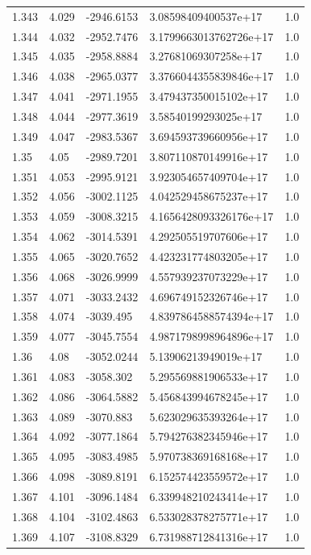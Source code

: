 \begin{tabular}{lllll}
1.343 & 4.029 & -2946.6153 & 3.08598409400537e+17 & 1.0 \\
1.344 & 4.032 & -2952.7476 & 3.1799663013762726e+17 & 1.0 \\
1.345 & 4.035 & -2958.8884 & 3.27681069307258e+17 & 1.0 \\
1.346 & 4.038 & -2965.0377 & 3.3766044355839846e+17 & 1.0 \\
1.347 & 4.041 & -2971.1955 & 3.479437350015102e+17 & 1.0 \\
1.348 & 4.044 & -2977.3619 & 3.58540199293025e+17 & 1.0 \\
1.349 & 4.047 & -2983.5367 & 3.694593739660956e+17 & 1.0 \\
1.35 & 4.05 & -2989.7201 & 3.807110870149916e+17 & 1.0 \\
1.351 & 4.053 & -2995.9121 & 3.923054657409704e+17 & 1.0 \\
1.352 & 4.056 & -3002.1125 & 4.042529458675237e+17 & 1.0 \\
1.353 & 4.059 & -3008.3215 & 4.1656428093326176e+17 & 1.0 \\
1.354 & 4.062 & -3014.5391 & 4.292505519707606e+17 & 1.0 \\
1.355 & 4.065 & -3020.7652 & 4.423231774803205e+17 & 1.0 \\
1.356 & 4.068 & -3026.9999 & 4.557939237073229e+17 & 1.0 \\
1.357 & 4.071 & -3033.2432 & 4.696749152326746e+17 & 1.0 \\
1.358 & 4.074 & -3039.495 & 4.8397864588574394e+17 & 1.0 \\
1.359 & 4.077 & -3045.7554 & 4.9871798998964896e+17 & 1.0 \\
1.36 & 4.08 & -3052.0244 & 5.13906213949019e+17 & 1.0 \\
1.361 & 4.083 & -3058.302 & 5.295569881906533e+17 & 1.0 \\
1.362 & 4.086 & -3064.5882 & 5.456843994678245e+17 & 1.0 \\
1.363 & 4.089 & -3070.883 & 5.623029635393264e+17 & 1.0 \\
1.364 & 4.092 & -3077.1864 & 5.794276382345946e+17 & 1.0 \\
1.365 & 4.095 & -3083.4985 & 5.970738369168168e+17 & 1.0 \\
1.366 & 4.098 & -3089.8191 & 6.152574423559572e+17 & 1.0 \\
1.367 & 4.101 & -3096.1484 & 6.339948210243414e+17 & 1.0 \\
1.368 & 4.104 & -3102.4863 & 6.533028378275771e+17 & 1.0 \\
1.369 & 4.107 & -3108.8329 & 6.731988712841316e+17 & 1.0 \\

\end{tabular}
